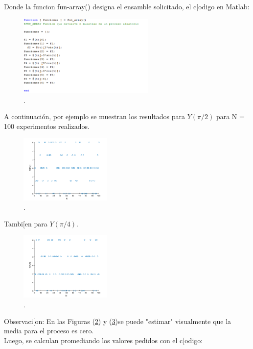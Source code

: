 Donde la funcion fun-array() designa el ensamble solicitado, el c[odigo en Matlab:

\begin{figure}[H]
\centering
	\includegraphics[width=0.6\textwidth, trim = {0 0 0 0},clip]{./ImagenesEjercicio1/fun_array.png}
	\caption{.}
	\label{fig:fun_array}
\end{figure}

A continuación, por ejemplo se muestran los resultados para $Y(\pi/2)$ para N = 100 experimentos realizados.

\begin{figure}[H]
\centering
	\includegraphics[width=0.4\textwidth, trim = {0 0 0 0},clip]{./ImagenesEjercicio1/ypi_2.png}
	\caption{.}
	\label{fig:ypi_2}
\end{figure}

Tambi[en para $Y(\pi/4)$.

\begin{figure}[H]
\centering
	\includegraphics[width=0.4\textwidth, trim = {0 0 0 0},clip]{./ImagenesEjercicio1/ypi_4.png}
	\caption{.}
	\label{fig:ypi_4}
\end{figure}

Observaci[on: En las Figuras (\ref{fig:ypi_2}) y (\ref{fig:ypi_4})se puede "estimar" visualmente que la media para el proceso es cero. 
\\
Luego, se calculan promediando los valores pedidos con el c[odigo:

